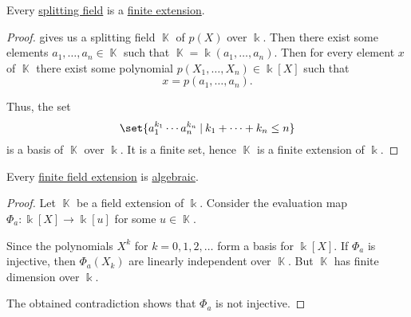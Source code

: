\begin{proposition}\label{thm:splitting_field_is_finite_extension}
  Every \hyperref[def:splitting_field]{splitting field} is a \hyperref[def:finite_field_extension]{finite extension}.
\end{proposition}
\begin{proof}
   gives us a splitting field \( \BbbK \) of \( p(X) \) over \( \Bbbk \). Then there exist some elements \( a_1, \ldots, a_n \in \BbbK \) such that \( \BbbK = \Bbbk(a_1, \ldots, a_n) \). Then for every element \( x \) of \( \BbbK \) there exist some polynomial \( p(X_1, \ldots, X_n) \in \Bbbk[X] \) such that
  \begin{equation*}
    x = p(a_1, \ldots, a_n).
  \end{equation*}

  Thus, the set
  \begin{equation*}
    \set{ a_1^{k_1} \cdots a_n^{k_n} \given k_1 + \cdots + k_n \leq n }
  \end{equation*}
  is a basis of \( \BbbK \) over \( \Bbbk \). It is a finite set, hence \( \BbbK \) is a finite extension of \( \Bbbk \).
\end{proof}

\begin{proposition}\label{thm:finite_field_extensions_are_algebraic}
  Every \hyperref[def:finite_field_extension]{finite field extension} is \hyperref[def:transcendental_element]{algebraic}.
\end{proposition}
\begin{proof}
  Let \( \BbbK \) be a field extension of \( \Bbbk \). Consider the evaluation map \( \Phi_a: \Bbbk[X] \to \Bbbk[u] \) for some \( u \in \BbbK \).

  Since the polynomials \( X^k \) for \( k = 0, 1, 2, \ldots \) form a basis for \( \Bbbk[X] \). If \( \Phi_a \) is injective, then \( \Phi_a(X_k) \) are linearly independent over \( \BbbK \). But \( \BbbK \) has finite dimension over \( \Bbbk \).

  The obtained contradiction shows that \( \Phi_a \) is not injective.
\end{proof}

